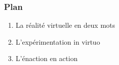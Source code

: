 \documentclass{beamer}
\begin{document}
\begin{frame}
\frametitle{Plan}
\LARGE
\mbox{}\hfill\begin{minipage}{11cm}\bf
\begin{enumerate}
\item La réalité virtuelle en deux mots
\vspace*{1cm}

\item L'expérimentation in virtuo
\vspace*{1cm}

\item L'énaction en action
\end{enumerate}
\end{minipage}
\hfill\mbox{}

\end{frame}
\note{}
\end{document}
